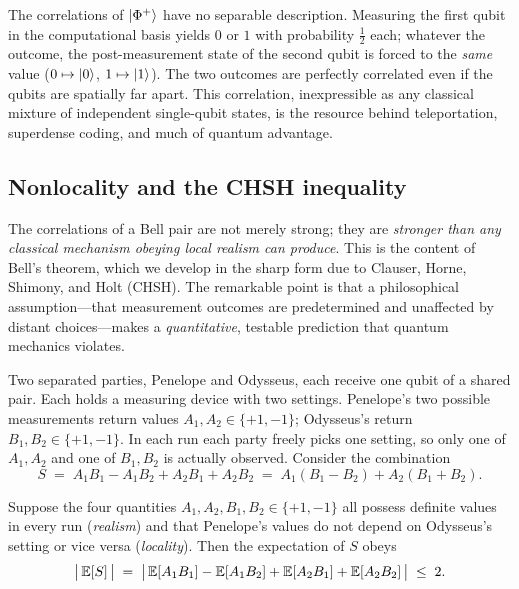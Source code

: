 \begin{remark}
The correlations of $\ket{\Phi^{+}}$ have no separable description. Measuring the
first qubit in the computational basis yields $0$ or $1$ with probability $\tfrac12$
each; whatever the outcome, the post-measurement state of the second qubit is forced
to the \emph{same} value ($0\mapsto\ket{0}$, $1\mapsto\ket{1}$). The two outcomes are
perfectly correlated even if the qubits are spatially far apart. This correlation,
inexpressible as any classical mixture of independent single-qubit states, is the
resource behind teleportation, superdense coding, and much of quantum advantage.
\end{remark}

\subsection{Nonlocality and the CHSH inequality}
\label{sec:lec01-chsh}

The correlations of a Bell pair are not merely strong; they are \emph{stronger than
any classical mechanism obeying local realism can produce}. This is the content of
Bell's theorem, which we develop in the sharp form due to Clauser, Horne, Shimony,
and Holt (CHSH). The remarkable point is that a philosophical assumption---that
measurement outcomes are predetermined and unaffected by distant choices---makes a
\emph{quantitative}, testable prediction that quantum mechanics violates.

Two separated parties, Penelope and Odysseus, each receive one qubit of a shared pair. Each
holds a measuring device with two settings. Penelope's two possible measurements return
values $A_1,A_2\in\{+1,-1\}$; Odysseus's return $B_1,B_2\in\{+1,-1\}$. In each run each
party freely picks one setting, so only one of $A_1,A_2$ and one of $B_1,B_2$ is
actually observed. Consider the combination
\begin{equation}\label{eq:lec01-chsh-S}
  S \;=\; A_1B_1-A_1B_2+A_2B_1+A_2B_2 \;=\; A_1(B_1-B_2)+A_2(B_1+B_2).
\end{equation}

\begin{theorem}\label{thm:lec01-chsh}
Suppose the four quantities $A_1,A_2,B_1,B_2\in\{+1,-1\}$ all possess definite values
in every run (\emph{realism}) and that Penelope's values do not depend on Odysseus's setting
or vice versa (\emph{locality}). Then the expectation of $S$ obeys
\[
  \bigl|\,\mathbb{E}[S]\,\bigr|\;=\;\bigl|\,\mathbb{E}[A_1B_1]-\mathbb{E}[A_1B_2]+\mathbb{E}[A_2B_1]+\mathbb{E}[A_2B_2]\,\bigr|\;\le\;2.
\]
\end{theorem}

